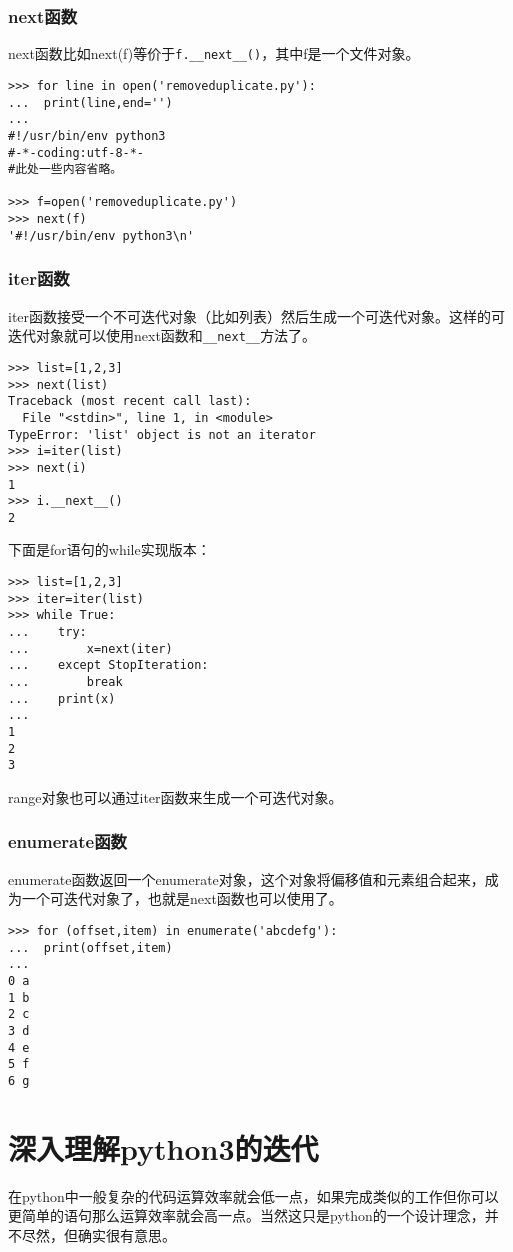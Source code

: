 \documentclass[12pt,oneside]{book}
\begin{document}
\begin{common-format}
\subsection{next函数}
next函数比如next(f)等价于\verb+f.__next__()+，其中f是一个文件对象。

\begin{Verbatim}
>>> for line in open('removeduplicate.py'):
...  print(line,end='')
... 
#!/usr/bin/env python3
#-*-coding:utf-8-*-
#此处一些内容省略。
    
>>> f=open('removeduplicate.py')
>>> next(f)
'#!/usr/bin/env python3\n'
\end{Verbatim}

\subsection{iter函数}
iter函数接受一个不可迭代对象（比如列表）然后生成一个可迭代对象。这样的可迭代对象就可以使用next函数和\verb+__next__+方法了。

\begin{Verbatim}
>>> list=[1,2,3]
>>> next(list)
Traceback (most recent call last):
  File "<stdin>", line 1, in <module>
TypeError: 'list' object is not an iterator
>>> i=iter(list)
>>> next(i)
1
>>> i.__next__()
2
\end{Verbatim}

下面是for语句的while实现版本：
\begin{Verbatim}
>>> list=[1,2,3]
>>> iter=iter(list)
>>> while True:
...    try:
...        x=next(iter)
...    except StopIteration:
...        break
...    print(x)
... 
1
2
3
\end{Verbatim}

range对象也可以通过iter函数来生成一个可迭代对象。

\subsection{enumerate函数}
enumerate函数返回一个enumerate对象，这个对象将偏移值和元素组合起来，成为一个可迭代对象了，也就是next函数也可以使用了。

\begin{Verbatim}
>>> for (offset,item) in enumerate('abcdefg'):
...  print(offset,item)
... 
0 a
1 b
2 c
3 d
4 e
5 f
6 g
\end{Verbatim}

\chapter{深入理解python3的迭代}
\label{sec:深入理解python3的迭代}
在python中一般复杂的代码运算效率就会低一点，如果完成类似的工作但你可以更简单的语句那么运算效率就会高一点。当然这只是python的一个设计理念，并不尽然，但确实很有意思。


\end{common-format}
\end{document}
